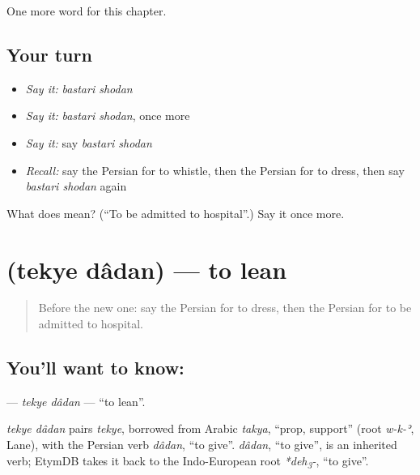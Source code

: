 \begin{grammarlens}[title={What you've built}]
One more word for this chapter.
\end{grammarlens}

\subsection*{Your turn}
\begin{itemize}
\raggedright
  \item \emph{Say it:} \emph{bastari shodan}
  \item \emph{Say it:} \emph{bastari shodan}, once more
  \item \emph{Say it:} say \emph{bastari shodan}
  \item \emph{Recall:} say the Persian for to whistle, then the Persian for to dress, then say \emph{bastari shodan} again
\end{itemize}

\begin{tcolorbox}[breakable,colback=teal!4,colframe=teal!35!black,title={Before you move on}]
What does   mean? (\textquotedblleft{}To be admitted to hospital\textquotedblright{}.) Say it once more.
\end{tcolorbox}
\section[\texorpdfstring{\fa{تکیه} \fa{دادن} (tekye dâdan)}{تکیه دادن (tekye dâdan)}]{  (tekye dâdan) — to lean}

\label{lesson:FA-C261-tekye-dadan}



\begin{quote}
Before the new one: say the Persian for to dress, then the Persian for to be admitted to hospital.
\end{quote}

\subsection*{You'll want to know:  }
\textbf{ } — \emph{tekye dâdan} — \textquotedblleft{}to lean\textquotedblright{}.

\begin{cousinweb}
\emph{tekye dâdan} pairs \emph{tekye}, borrowed from Arabic \emph{takya}, \textquotedblleft{}prop, support\textquotedblright{} (root \emph{w-k-ʾ}, Lane), with the Persian verb \emph{dâdan}, \textquotedblleft{}to give\textquotedblright{}. \emph{dâdan}, \textquotedblleft{}to give\textquotedblright{}, is an inherited verb; EtymDB takes it back to the Indo-European root \emph{*deh\textsubscript{3}-}, \textquotedblleft{}to give\textquotedblright{}.
\end{cousinweb}

